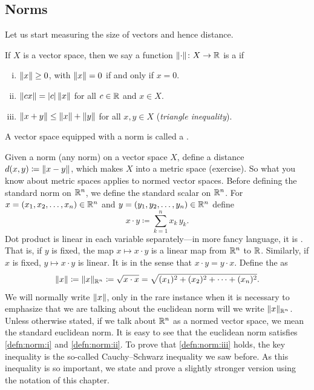 
\subsection{Norms}

Let us start measuring the size of vectors and hence distance.

\begin{defn}
If $X$ is a vector space, then we say
a function $\lVert {\cdot} \rVert \colon X \to {\mathbb{R}}$ is a
\emph{} if
\begin{enumerate}[(i)]
\item \label{defn:norm:i} $\lVert {x} \rVert \geq 0$, with $\lVert {x} \rVert=0$ if and only if $x=0$.
\item \label{defn:norm:ii} $\lVert {cx} \rVert = \lvert {c} \rvert \, \lVert {x} \rVert$ for all $c \in {\mathbb{R}}$ and $x \in X$.
\item \label{defn:norm:iii} $\lVert {x+y} \rVert \leq \lVert {x} \rVert+\lVert {y} \rVert$ for all
$x,y \in X$
\qquad (\emph{triangle inequality}).
\end{enumerate}
A vector space equipped with a norm is called a
\emph{}.
\end{defn}

Given a norm (any norm) on a vector space $X$,
define a distance $d(x,y) \coloneqq \lVert {x-y} \rVert$, which
makes $X$ into a metric space (exercise).
So what you know about metric spaces applies to normed vector spaces.
Before defining the standard norm on ${\mathbb{R}}^n$, we
define the standard 
scalar \emph{} on ${\mathbb{R}}^n$.
For 
$x=(x_1,x_2,\ldots,x_n) \in {\mathbb{R}}^n$
and $y=(y_1,y_2,\ldots,y_n) \in {\mathbb{R}}^n$ define
\begin{equation*}
x \cdot y \coloneqq \sum_{k=1}^n x_k\, y_k .
\end{equation*}
Dot product is linear in each variable
separately---in more fancy language, it is \emph{}.
That is,
if $y$ is fixed, the map $x \mapsto x \cdot y$ is a linear map from
${\mathbb{R}}^n$ to ${\mathbb{R}}$.  Similarly, if $x$ is fixed,
$y \mapsto x \cdot y$ is linear.
It is \emph{} in the sense that $x \cdot y = y \cdot x$.
Define the \emph{} as
\begin{equation*}
\lVert {x} \rVert \coloneqq \lVert {x} \rVert_{{\mathbb{R}}^n} \coloneqq \sqrt{x \cdot x} = \sqrt{(x_1)^2+(x_2)^2 + \cdots + (x_n)^2}.
\end{equation*}
We will normally write $\lVert {x} \rVert$, only in the rare instance when it is necessary to
emphasize that we are talking about the euclidean norm will we write
$\lVert {x} \rVert_{{\mathbb{R}}^n}$.
Unless otherwise stated, if we talk about ${\mathbb{R}}^n$ as a normed vector space,
we mean the standard euclidean norm.
It is easy to see that the euclidean norm satisfies \ref{defn:norm:i} and
\ref{defn:norm:ii}.  To prove
that \ref{defn:norm:iii} holds, the key
inequality is the so-called Cauchy--Schwarz inequality
we saw before.  As this inequality is so important, we state and
prove a slightly stronger version using the notation of this chapter.

